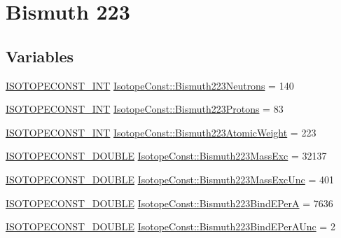 \hypertarget{group___isotope_const-_bismuth-_bi223}{}\section{Bismuth 223}
\label{group___isotope_const-_bismuth-_bi223}
\subsection*{Variables}
\begin{DoxyCompactItemize}
\item 
\mbox{\hyperlink{group___isotope_const-_macros_ga5f18360b3e99483a35c32d789e62621c}{I\+S\+O\+T\+O\+P\+E\+C\+O\+N\+S\+T\+\_\+\+I\+NT}} \mbox{\hyperlink{group___isotope_const-_bismuth-_bi223_ga315512d67fd3c13c873bedfd7e6642ca}{Isotope\+Const\+::\+Bismuth223\+Neutrons}} = 140
\item 
\mbox{\hyperlink{group___isotope_const-_macros_ga5f18360b3e99483a35c32d789e62621c}{I\+S\+O\+T\+O\+P\+E\+C\+O\+N\+S\+T\+\_\+\+I\+NT}} \mbox{\hyperlink{group___isotope_const-_bismuth-_bi223_gaff62f7a68b9e5bb9c53e6fb007c3d920}{Isotope\+Const\+::\+Bismuth223\+Protons}} = 83
\item 
\mbox{\hyperlink{group___isotope_const-_macros_ga5f18360b3e99483a35c32d789e62621c}{I\+S\+O\+T\+O\+P\+E\+C\+O\+N\+S\+T\+\_\+\+I\+NT}} \mbox{\hyperlink{group___isotope_const-_bismuth-_bi223_ga616c0a93b0b58d7a33a00c932861fe5c}{Isotope\+Const\+::\+Bismuth223\+Atomic\+Weight}} = 223
\item 
\mbox{\hyperlink{group___isotope_const-_macros_ga8f45a7272ce02c0b4c65c44636ed719a}{I\+S\+O\+T\+O\+P\+E\+C\+O\+N\+S\+T\+\_\+\+D\+O\+U\+B\+LE}} \mbox{\hyperlink{group___isotope_const-_bismuth-_bi223_ga2f710bc13e27e33450927b7591de47b6}{Isotope\+Const\+::\+Bismuth223\+Mass\+Exc}} = 32137
\item 
\mbox{\hyperlink{group___isotope_const-_macros_ga8f45a7272ce02c0b4c65c44636ed719a}{I\+S\+O\+T\+O\+P\+E\+C\+O\+N\+S\+T\+\_\+\+D\+O\+U\+B\+LE}} \mbox{\hyperlink{group___isotope_const-_bismuth-_bi223_ga71640600c58e01d36e4a25eb86675c58}{Isotope\+Const\+::\+Bismuth223\+Mass\+Exc\+Unc}} = 401
\item 
\mbox{\hyperlink{group___isotope_const-_macros_ga8f45a7272ce02c0b4c65c44636ed719a}{I\+S\+O\+T\+O\+P\+E\+C\+O\+N\+S\+T\+\_\+\+D\+O\+U\+B\+LE}} \mbox{\hyperlink{group___isotope_const-_bismuth-_bi223_gad3234bf77ffab1596832440a8981dcae}{Isotope\+Const\+::\+Bismuth223\+Bind\+E\+PerA}} = 7636
\item 
\mbox{\hyperlink{group___isotope_const-_macros_ga8f45a7272ce02c0b4c65c44636ed719a}{I\+S\+O\+T\+O\+P\+E\+C\+O\+N\+S\+T\+\_\+\+D\+O\+U\+B\+LE}} \mbox{\hyperlink{group___isotope_const-_bismuth-_bi223_gae9359f88ae0cb82728da398623203345}{Isotope\+Const\+::\+Bismuth223\+Bind\+E\+Per\+A\+Unc}} = 2

\end{DoxyCompactItemize}
